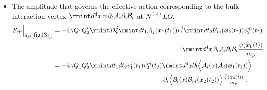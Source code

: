 \begin{itemize}
\begin{align}
\begin{split}
=-4\gamma Q_1Q_2'\rmint dt\, \,\Bigg[\boldsymbol{v}_1(t)\cdot \boldsymbol{v}_2(t)\rmint_k \frac{e^{-i\boldsymbol{k}\cdot \boldsymbol{r}}}{(\boldsymbol{k}^2+\mu^2)}\Bigg]                \frac{\Bar{\psi}(\boldsymbol{x}_0(t))}{m_p}\,,\\ &
=-\frac{\gamma Q_1 Q_2'}{\pi}\rmint dt\, \boldsymbol{v}_1\cdot \boldsymbol{v}_2\, \frac{e^{-\mu_{\gamma}r}}{r}\Big(\frac{\Bar{\psi}(\boldsymbol{x}_{0}(t))}{m_p}\Big)+(1\leftrightarrow 2)\,\sim \mathcal{O}(L^{1/2}v^{9/2}).
\end{split}
\end{align}
\item \textcolor{black}{ The amplitude that governs the effective action corresponding to the bulk interaction vertex $\rmint d^4x\,\psi \partial_l\mathcal{A}_i\partial_i\mathcal{B}_l$ at $N^{(4)}LO$,} 
\begin{align}
    \begin{split}
   \mathcal{S}_{\text{eff}}\Big |_{\text{fig}(\ref{fig13j})}&=-4\gamma Q_1Q_2'\rmint \Bar{\mathcal{D}}\hat{\xi}\rmint dt_1\mathcal{A}_j(\boldsymbol{x}_1(t_1))v_1^j\rmint dt_2\mathcal{B}_m(\boldsymbol{x}_2(t_2))v_2^m(t_2)\\& \,\,\,\,\,\,\,\,\,\,\,\,\,\,\,\,\,\,\,\,\,\,\,\,\,\,\,\,\,\, \,\,\,\,\,\,\,\,\,\,\,\,\,\,\,\,\,\,\,\,\,\,\,\,\,\,\,\,\,\, \,\,\,\,\,\,\,\,\,\,\,\,\,\,\,\,\,\,\,\,\,\,\,\,\,\,\,\,\,\,\,\,\,\,\,\,\,\,\,\,\,\,\,\,\,\,\,\,\,\,\,\,\,\,\,\,\,\,\,\,  \rmint d^4x\,\partial_l\mathcal{A}_i\partial_i\mathcal{B}_l \frac{ \Bar{\psi}(\boldsymbol{x}_0(t))}{m_p}\\&
   =-4\gamma\textstyle{Q_1 Q_2'\rmint dt_1dt_2v_1^j(t_1)v_2^m(t_2)\rmint d^4x\partial_l\Big{\langle}\mathcal{A}_i(x)\mathcal{A}_j(\boldsymbol{x}_1(t_1))\Big{\rangle}}\\&\hspace{6cm}\textstyle{\partial_i\Big{\langle}\mathcal{B}_l(x)\mathcal{B}_m(\boldsymbol{x}_2(t_2))\Big{\rangle}\frac{\Bar{\psi}(\boldsymbol{x}_0(t))}{m_p}}\,,\\ &

\end{split}
\end{align}
\end{itemize}
